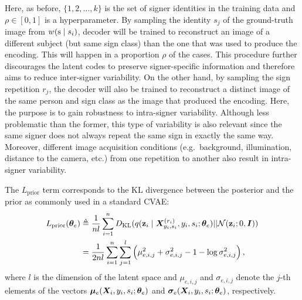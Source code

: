 Here, as before, $\{1,2,\dots,k\}$ is the set of signer identities in the training data and $\rho \in [0, 1]$ is a hyperparameter. By sampling the identity $s_{j}$ of the ground-truth image from $w({\textnormal{s}} \mid s_{i})$, decoder will be trained to reconstruct an image of a different subject (but same sign class) than the one that was used to produce the encoding. This will happen in a proportion $\rho$ of the cases. This procedure further discourages the latent codes to preserve signer-specific information and therefore aims to reduce inter-signer variability. On the other hand, by sampling the sign repetition $r_{j}$, the decoder will also be trained to reconstruct a distinct image of the same person and sign class as the image that produced the encoding. Here, the purpose is to gain robustness to intra-signer variability. Although less problematic than the former, this type of variability is also relevant since the same signer does not always repeat the same sign in exactly the same way. Moreover, different image acquisition conditions (e.g.\ background, illumination, distance to the camera, etc.) from one repetition to another also result in intra-signer variability.

The $L_{\text{prior}}$ term corresponds to the KL divergence between the posterior and the prior as commonly used in a standard CVAE:
\begin{align}
    \label{eq:loss_prior}
    L_{\text{prior}}({\bm{\theta}}_{e}) &\triangleq \frac{1}{nl} \sum_{i=1}^n D_{\mathrm{KL}}(q({\mathbf{z}}_{i} \mid {\bm{X}}^{(r_{i})}_{y_{i},s_{i}}, y_{i}, s_{i}; {\bm{\theta}}_e) || {\mathcal{N}}({\mathbf{z}}_{i}; 0, {\bm{I}})) \nonumber\\
    &= \frac{1}{2nl} \sum_{i=1}^n \sum_{j=1}^l \left(\mu_{e,i,j}^2 + \sigma_{e,i,j}^2 -1 - \log \sigma_{e,i,j}^2\right),
\end{align}
where $l$ is the dimension of the latent space and $\mu_{e,i,j}$ and $\sigma_{e,i,j}$ denote the $j$-th elements of the vectors ${\bm{\mu}}_{e}({\bm{X}}_i, y_i, s_i; {\bm{\theta}}_e)$ and ${\bm{\sigma}}_{e}({\bm{X}}_i, y_i, s_i; {\bm{\theta}}_e)$, respectively.

